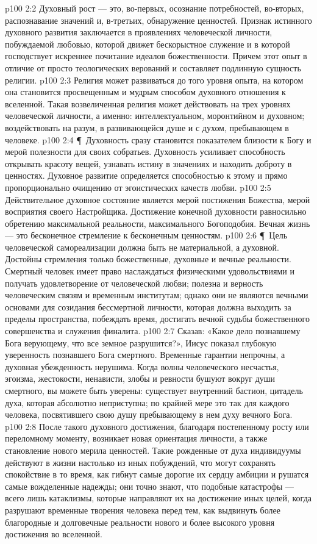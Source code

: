 \vs p100 2:2 Духовный рост --- это, во\hyp{}первых, осознание потребностей, во\hyp{}вторых, распознавание значений и, в\hyp{}третьих, обнаружение ценностей. Признак истинного духовного развития заключается в проявлениях человеческой личности, побуждаемой любовью, которой движет бескорыстное служение и в которой господствует искреннее почитание идеалов божественности. Причем этот опыт в отличие от просто теологических верований и составляет подлинную сущность религии.
\vs p100 2:3 Религия может развиваться до того уровня опыта, на котором она становится просвещенным и мудрым способом духовного отношения к вселенной. Такая возвеличенная религия может действовать на трех уровнях человеческой личности, а именно: интеллектуальном, моронтийном и духовном; воздействовать на разум, в развивающейся душе и с духом, пребывающем в человеке.
\vs p100 2:4 \P\ Духовность сразу становится показателем близости к Богу и мерой полезности для своих собратьев. Духовность усиливает способность открывать красоту вещей, узнавать истину в значениях и находить доброту в ценностях. Духовное развитие определяется способностью к этому и прямо пропорционально очищению от эгоистических качеств любви.
\vs p100 2:5 Действительное духовное состояние является мерой постижения Божества, мерой восприятия своего Настройщика. Достижение конечной духовности равносильно обретению максимальной реальности, максимального Богоподобия. Вечная жизнь --- это бесконечное стремление к бесконечным ценностям.
\vs p100 2:6 \P\ Цель человеческой самореализации должна быть не материальной, а духовной. Достойны стремления только божественные, духовные и вечные реальности. Смертный человек имеет право наслаждаться физическими удовольствиями и получать удовлетворение от человеческой любви; полезна и верность человеческим связям и временным институтам; однако они не являются вечными основами для созидания бессмертной личности, которая должна выходить за пределы пространства, побеждать время, достигать вечной судьбы божественного совершенства и служения финалита.
\vs p100 2:7 Сказав: «Какое дело познавшему Бога верующему, что все земное разрушится?», Иисус показал глубокую уверенность познавшего Бога смертного. Временные гарантии непрочны, а духовная убежденность нерушима. Когда волны человеческого несчастья, эгоизма, жестокости, ненависти, злобы и ревности бушуют вокруг души смертного, вы можете быть уверены: существует внутренний бастион, цитадель духа, которая абсолютно неприступна; по крайней мере это так для каждого человека, посвятившего свою душу пребывающему в нем духу вечного Бога.
\vs p100 2:8 После такого духовного достижения, благодаря постепенному росту или переломному моменту, возникает новая ориентация личности, а также становление нового мерила ценностей. Такие рожденные от духа индивидуумы действуют в жизни настолько из иных побуждений, что могут сохранять спокойствие в то время, как гибнут самые дорогие их сердцу амбиции и рушатся самые вожделенные надежды; они точно знают, что подобные катастрофы --- всего лишь катаклизмы, которые направляют их на достижение иных целей, когда разрушают временные творения человека перед тем, как выдвинуть более благородные и долговечные реальности нового и более высокого уровня достижения во вселенной.
